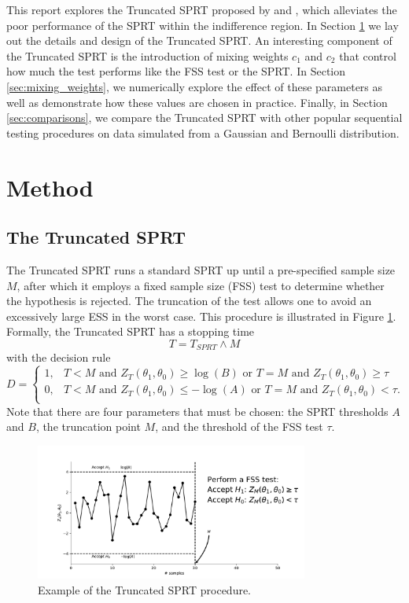 \documentclass[11pt]{article}
\begin{document}
This report explores the Truncated SPRT proposed by \citet{tantara1977} and \citet{tantara1982}, which alleviates the poor performance of the SPRT within the indifference region. In Section \ref{sec:method} we lay out the details and design of the Truncated SPRT. An interesting component of the Truncated SPRT is the introduction of mixing weights $c_1$ and $c_2$ that control how much the test performs like the FSS test or the SPRT. In Section \ref{sec:mixing_weights}, we numerically explore the effect of these parameters as well as demonstrate how these values are chosen in practice. Finally, in Section \ref{sec:comparisons}, we compare the Truncated SPRT with other popular sequential testing procedures on data simulated from a Gaussian and Bernoulli distribution.

\section{Method}\label{sec:method}

\subsection{The Truncated SPRT}

The Truncated SPRT runs a standard SPRT up until a pre-specified sample size $M$, after which it employs a fixed sample size (FSS) test to determine whether the hypothesis is rejected. The truncation of the test allows one to avoid an excessively large ESS in the worst case. This procedure is illustrated in Figure \ref{fig:trunc_sprt}.  Formally, the Truncated SPRT has a stopping time
\begin{equation}
T = T_{SPRT} \wedge M
\end{equation}
with the decision rule
\begin{equation}
D =
\begin{cases}
1, & T < M \text{ and } Z_T(\theta_1, \theta_0) \geq \log(B) \text{ or } T = M \text{ and } Z_T(\theta_1, \theta_0) \geq \tau \\
0, & T < M \text{ and } Z_T(\theta_1, \theta_0) \leq -\log(A) \text{ or } T = M \text{ and } Z_T(\theta_1, \theta_0) < \tau. \\
\end{cases}
\end{equation}
Note that there are four parameters that must be chosen: the SPRT thresholds $A$ and $B$, the truncation point $M$, and the threshold of the FSS test $\tau$.
\begin{figure}
\centering
\includegraphics[width=0.8\textwidth]{images/truncated_sprt}
\caption{Example of the Truncated SPRT procedure.}
\label{fig:trunc_sprt}
\end{figure}
\end{document}
